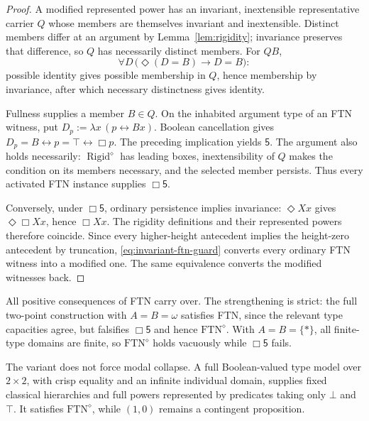 \documentclass[11pt,letterpaper,numbers=noenddot]{scrartcl}
\numberwithin{equation}{section}
\theoremstyle{definition}
\newcommand{\Rigid}{\operatorname{Rigid}}
\newcommand{\FTN}{\mathrm{FTN}}
\begin{document}
\begin{proof}
A modified represented power has an invariant, inextensible representative carrier $Q$ whose members are themselves invariant and inextensible. Distinct members differ at an argument by Lemma~\ref{lem:rigidity}; invariance preserves that difference, so $Q$ has necessarily distinct members. For $QB$,
\[
\forall D\,\bigl(\Diamond(D=B)\to D=B\bigr):
\]
possible identity gives possible membership in $Q$, hence membership by invariance, after which necessary distinctness gives identity.

Fullness supplies a member $B\in Q$. On the inhabited argument type of an FTN witness, put $D_p:=\lambda x\,(p\leftrightarrow Bx)$. Boolean cancellation gives
$D_p=B\leftrightarrow p=\top\leftrightarrow\Box p$.
The preceding implication yields $\mathsf 5$. The argument also holds necessarily: $\Rigid^\diamond$ has leading boxes, inextensibility of $Q$ makes the condition on its members necessary, and the selected member persists. Thus every activated FTN instance supplies $\Box\mathsf 5$.

Conversely, under $\Box\mathsf 5$, ordinary persistence implies invariance: $\Diamond Xx$ gives $\Diamond\Box Xx$, hence $\Box Xx$. The rigidity definitions and their represented powers therefore coincide. Since every higher-height antecedent implies the height-zero antecedent by truncation, \eqref{eq:invariant-ftn-guard} converts every ordinary FTN witness into a modified one. The same equivalence converts the modified witnesses back.
\end{proof}

All positive consequences of FTN carry over. The strengthening is strict: the full two-point construction with $A=B=\omega$ satisfies FTN, since the relevant type capacities agree, but falsifies $\Box\mathsf 5$ and hence $\FTN^\diamond$. With $A=B=\{*\}$, all finite-type domains are finite, so $\FTN^\diamond$ holds vacuously while $\Box\mathsf 5$ fails.

The variant does not force modal collapse. A full Boolean-valued type model over $2\times2$, with crisp equality and an infinite individual domain, supplies fixed classical hierarchies and full powers represented by predicates taking only $\bot$ and $\top$. It satisfies $\FTN^\diamond$, while $(1,0)$ remains a contingent proposition.
\end{document}
